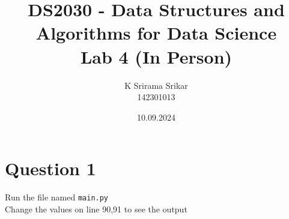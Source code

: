 \documentclass{article}
\title{\textbf{DS2030 - Data Structures and Algorithms for Data Science \\Lab 4 (In Person)}}
\author{K Srirama Srikar \\142301013 }
\date{10.09.2024}
\begin{document}
\maketitle
\section{Question 1}
Run the file named \texttt{main.py} \\ Change the values on line 90,91 to see the output
\end{document}

